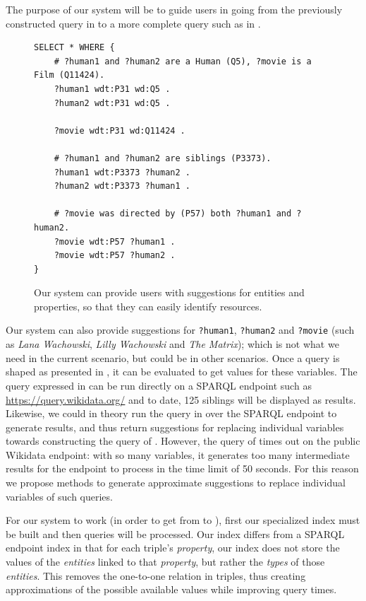 The purpose of our system will be to guide users in going from the previously constructed query in  to a more complete query such as in .

\begin{figure}[H]
\begin{verbatim}
SELECT * WHERE {
    # ?human1 and ?human2 are a Human (Q5), ?movie is a Film (Q11424).
    ?human1 wdt:P31 wd:Q5 .
    ?human2 wdt:P31 wd:Q5 .
    
    ?movie wdt:P31 wd:Q11424 .
    
    # ?human1 and ?human2 are siblings (P3373).
    ?human1 wdt:P3373 ?human2 .
    ?human2 wdt:P3373 ?human1 .
    
    # ?movie was directed by (P57) both ?human1 and ?human2.
    ?movie wdt:P57 ?human1 .
    ?movie wdt:P57 ?human2 .
}
\end{verbatim}
\caption{Our system can provide users with suggestions for entities and properties, so that they can easily identify resources.}
\label{fig:siblingsSPARQLFull}
\end{figure}

Our system can also provide suggestions for \texttt{?human1}, \texttt{?human2} and \texttt{?movie} (such as \textit{Lana Wachowski}, \textit{Lilly Wachowski} and \textit{The Matrix}); which is not what we need in the current scenario, but could be in other scenarios. Once a query is shaped as presented in , it can be evaluated to get values for these variables. The query expressed in  can be run directly on a SPARQL endpoint such as \url{https://query.wikidata.org/} and to date, 125 siblings will be displayed as results. Likewise, we could in theory run the query in  over the SPARQL endpoint to generate results, and thus return suggestions for replacing individual variables towards constructing the query of . However, the query of  times out on the public Wikidata endpoint: with so many variables, it generates too many intermediate results for the endpoint to process in the time limit of 50 seconds. For this reason we propose methods to generate approximate suggestions to replace individual variables of such queries.

For our system to work (in order to get from  to ), first our specialized index must be built and then queries will be processed. Our index differs from a SPARQL endpoint index in that for each triple's \textit{property}, our index does not store the values of the \textit{entities} linked to that \textit{property}, but rather the \textit{types} of those \textit{entities}. This removes the one-to-one relation in triples, thus creating approximations of the possible available values while improving query times.

